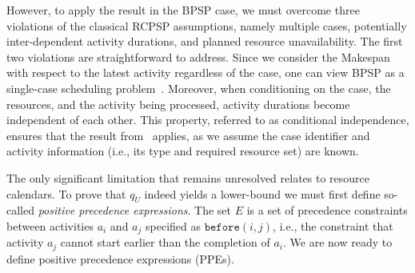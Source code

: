 However, to apply the result in the BPSP case, we must overcome three violations of the classical RCPSP assumptions, namely multiple cases, potentially inter-dependent activity durations, and planned resource unavailability. 
The first two violations are straightforward to address.  
Since we consider the Makespan with respect to the latest activity regardless of the case, one can view BPSP as a single-case scheduling problem~\cite{sanchez2023survey}.  
Moreover, when conditioning on the case, the resources, and the activity being processed, activity durations become independent of each other. This property, referred to as conditional independence, ensures that the result from~\cite{beck2007proactive} applies, as we assume the case identifier and activity information (i.e., its type and required resource set) are known.  

The only significant limitation that remains unresolved relates to resource calendars.
To prove that $q_U$ indeed yields a lower-bound we must
first define so-called \emph{positive precedence expressions}.
The set $E$ is a set of precedence constraints between activities $a_i$ and $a_j$ specified as $\texttt{before}(i, j)$, i.e., the constraint that activity $a_j$ cannot 
start earlier than the completion of $a_i$.
We are now ready to define positive precedence expressions (PPEs). 

